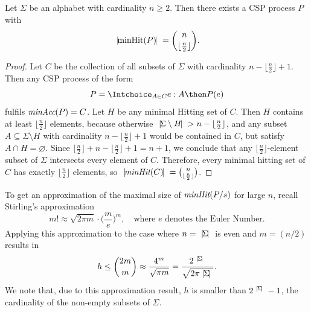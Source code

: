 \begin{theorem}
\label{th:upperboundh}
Let  $\Sigma$  be an alphabet with cardinality $n\ge 2$.  Then  
there exists a CSP process $P$ with 
\[
{~|\! \text{minHit}(P)\!|~} = \binom{n}{\lfloor\frac{n}{2}\rfloor}.
\]
\end{theorem}
\begin{proof}
Let $C$ be the collection of all subsets of $\Sigma$ with cardinality 
$n-\lfloor{\frac{n}{2}}\rfloor+1$. Then any CSP process of the form 
\[
P = \Intchoice_{A\in C} e:A\then P(e)
\]
fulfils $\text{\it minAcc}(P) = C$.
Let $H$ be any minimal Hitting set of $C$. Then $H$ contains at least $\lfloor{\frac{n}{2}}\rfloor$ elements, because 
otherwise
${~|\! \Sigma\setminus H\!|~} > n-\lfloor{\frac{n}{2}}\rfloor$, 
and any subset $A\subseteq \Sigma\setminus H$ with cardinality
$n-\lfloor{\frac{n}{2}}\rfloor+1$  would be contained in $C$, but satisfy 
$A\cap H=\varnothing$. 
Since $\lfloor{\frac{n}{2}}\rfloor+n-\lfloor{\frac{n}{2}}\rfloor+1=n+1$, we conclude
 that any $\lfloor{\frac{n}{2}}\rfloor$-element subset of $\Sigma$ 
 intersects  every element of $C$.  Therefore, every minimal hitting set of $C$ has exactly $\lfloor{\frac{n}{2}}\rfloor$ elements,
so ${~|\! \text{\it minHit}(C)\!|~} = \binom{n}{\lfloor{\frac{n}{2}}\rfloor}$.
\xbox
\end{proof}


To get an approximation of the maximal size of $\text{\it minHit}(P/s)$ for large $n$, recall
Stirling's approximation~\cite[p.~112]{Graham:1994:CMF:562056}
\[
m! \approx \sqrt{2\pi m} \cdot \big( \frac{m}{e} \big)^m, \quad\text{where $e$ denotes the Euler Number.}
\]
Applying this approximation to the   case where $n = {~|\! \Sigma\!|~}$ is even and $m = (n/2)$  
results in
\[
h \le \binom{2m}{m} \approx \frac{4^m}{\sqrt{\pi m}} = 
\frac{2^{~|\! \Sigma\!|~}}{\sqrt{2\pi {~|\! \Sigma\!|~}}}.
\]
%
We note that, due to this approximation result, 
$h$ is   smaller than $2^{{~|\! \Sigma\!|~}}-1$, the cardinality of the 
non-empty subsets of $\Sigma$.

